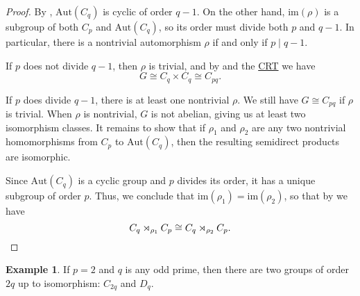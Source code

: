 \documentclass[12pt]{report}
\numberwithin{equation}{section}
\numberwithin{theorem}{chapter}
\theoremstyle{definition}
\newtheorem{example}[theorem]{Example}
\newtheorem*{basic properties}{Basic Properties}
\newtheorem*{Important Remark}{Important Remark}
\def\sdp{\rtimes}
\begin{document}
\begin{proof}
By , $\mathrm{Aut}(C_q)$ is cyclic of order $q-1$. On the other hand, $\mathrm{im}(\rho)$ is a subgroup of both $C_p$ and $\mathrm{Aut}(C_q)$, so its order must divide both $p$ and $q-1$. In particular, there is a nontrivial automorphism $\rho$ if and only if $p \mid q-1$. 

If $p$ does not divide $q-1$, then $\rho$ is trivial, and by  and the \hyperref[CRT]{CRT} we have 
$$G \cong C_q \times C_q \cong C_{pq}.$$

If $p$ does divide $q-1$, there is at least one nontrivial $\rho$.
We still have $G \cong C_{pq}$ if $\rho$ is trivial. When $\rho$ is nontrivial, $G$ is not abelian, giving us at least two isomorphism classes. 
It remains to show that if $\rho_1$ and $\rho_2$ are any two nontrivial homomorphisms from $C_p$ to $\mathrm{Aut}(C_q)$, then the resulting semidirect products are isomorphic.

Since $\mathrm{Aut}(C_q)$ is a cyclic group and $p$ divides its order, it has a unique subgroup of order $p$.
Thus, we conclude that $\mathrm{im}(\rho_1) = \mathrm{im}(\rho_2)$, so that by  we have
$$C_q \sdp_{\rho_1} C_p \cong C_q \sdp_{\rho_2} C_p.\qedhere$$
\end{proof}




\begin{example} 
	If $p =2$ and $q$ is any odd prime, then there are two groups of order $2q$ up to isomorphism: $C_{2q}$ and $D_{q}$.
\end{example}
\end{document}
